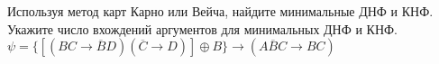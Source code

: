 \question Используя метод карт Карно или Вейча, найдите минимальные ДНФ и КНФ. Укажите число вхождений аргументов для минимальных ДНФ и КНФ.
$\psi = \{[(BC \rightarrow \overline{B}D)(\overline{C} \rightarrow D)] \oplus B \} \rightarrow (A\overline{B}C \rightarrow BC)$